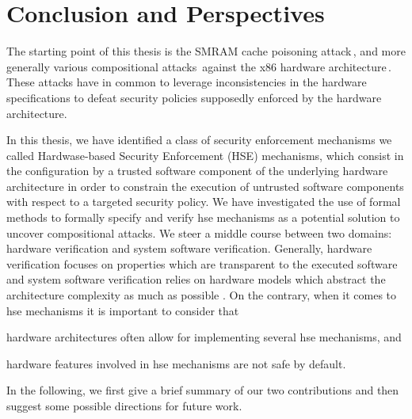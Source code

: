 \chapter{Conclusion and Perspectives}
\label{chapter:conclusion}


\vspace{1cm}%
\noindent
%
The starting point of this thesis is the SMRAM cache poisoning
attack\,\cite{duflot2009smram,wojtczuk2009smram}, and more generally various
compositional attacks\,\cite{wing2003compositionalattack} against the x86
hardware
architecture\,\cite{kovah2015senter,domas2015sinkhole,kallenberg2015racecondition}.
%
These attacks have in common to leverage inconsistencies in the hardware
specifications to defeat security policies supposedly enforced by the hardware
architecture.

In this thesis, we have identified a class of security enforcement mechanisms we
called Hardwase-based Security Enforcement (HSE) mechanisms, which consist in
the configuration by a trusted software component of the underlying hardware
architecture in order to constrain the execution of untrusted software
components with respect to a targeted security policy.
%
We have investigated the use of formal methods to formally specify and verify
\ac{hse} mechanisms as a potential solution to uncover compositional attacks.
%
We steer a middle course between two domains: hardware verification and system
software verification.
%
Generally, hardware verification focuses on properties which are transparent to
the executed software and system software verification relies on
hardware models which abstract the architecture complexity as much as possible .
%
On the contrary, when it comes to \ac{hse} mechanisms it is important to
consider that
%
\begin{inparaenum}[(1)]
\item \label{needreuse}%
  hardware architectures often allow for implementing several \ac{hse}
  mechanisms, and
\item \label{needreduce}%
  hardware features involved in \ac{hse} mechanisms are not safe by default.
\end{inparaenum}

In the following, we first give a brief summary of our two contributions and then suggest some possible directions for future work.

